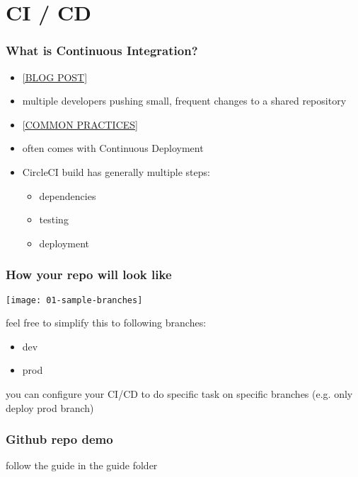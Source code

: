 \section{CI / CD}

\frame{\tableofcontents[currentsection]}

\begin{frame}
    \frametitle{What is Continuous Integration?}   
    \begin{itemize}
        \item \href{https://circleci.com/blog/what-is-continuous-integration/}{[BLOG POST]}
        \item multiple developers pushing small, frequent changes to a shared repository
        \item \href{https://en.wikipedia.org/wiki/Continuous_integration}{[COMMON PRACTICES]}
        \item often comes with Continuous Deployment
        \item CircleCI build has generally multiple steps:
        \begin{itemize}
            \item dependencies
            \item testing
            \item deployment
        \end{itemize}
    \end{itemize}
\end{frame}

\begin{frame}
    \frametitle{How your repo will look like}   
    \texttt{[image: 01-sample-branches]}
    
    feel free to simplify this to following branches:
    \begin{itemize}
        \item dev
        \item prod
    \end{itemize}
    you can configure your CI/CD to do specific task on specific branches (e.g. only deploy prod branch)
\end{frame}

\begin{frame}
    \frametitle{Github repo demo}
    follow the guide in the guide folder
\end{frame}
